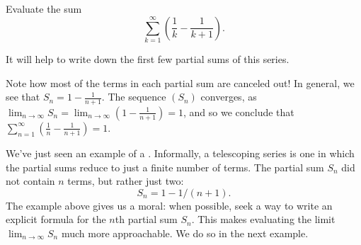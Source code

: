 \documentclass{ximera}
\begin{document}
\begin{example}
  Evaluate the sum
  \[
  \sum_{k=1}^\infty\left(\frac{1}{k}-\frac{1}{k+1}\right).
  \]
  \begin{explanation}
It will help to write down the first few partial sums of this
series.
\begin{image}
\end{image}
Note how most of the terms in each partial sum are canceled out! In
general, we see that $S_n = 1-\frac{1}{n+1}$. The sequence $(S_n)$
converges, as $\lim_{n\to\infty}S_n =
\lim_{n\to\infty}\left(1-\frac1{n+1}\right) = 1$, and so we conclude
that $\sum_{n=1}^\infty \left(\frac1n-\frac1{n+1}\right) = 1$.
  \end{explanation}
\end{example}
We've just seen an example of a . Informally,
a telescoping series is one in which the partial sums reduce to just a
finite number of terms. The partial sum $S_n$ did not contain $n$
terms, but rather just two:
\[
S_n = 1 - 1/(n+1).
\]
The example above gives us a moral: when possible, seek a way to write
an explicit formula for the $n$th partial sum $S_n$. This makes
evaluating the limit $\lim_{n\to\infty} S_n$ much more
approachable. We do so in the next example.
\end{document}
